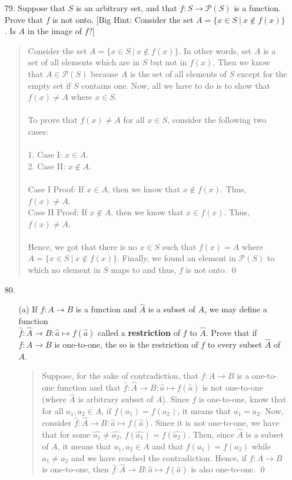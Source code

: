 \documentclass[12pt, a4paper]{article}
\begin{document}
\begin{itemize}
\item[79.]
Suppose that $S$ is an arbitrary set, and that $f : S \rightarrow \mathcal{P}(S)$ is a function. Prove
that $f$ is not onto. [Big Hint: Consider the set $A = \{x \in S \ | \ x \notin f(x)\}$. Is $A$ in the image of $f$?]
\begin{quote}
Consider the set $A = \{x \in S \ | \ x \notin f(x)\}$. In other words, set $A$ is a set of all elements
which are in $S$ but not in $f(x)$. Then we know that $A \in \mathcal{P}(S)$ because $A$
is the set of all elements of $S$ except for the empty set if $S$ contains one.
Now, all we have to do is to show that $f(x) \neq A$ where $x \in S$.\\\\
To prove that $f(x) \neq A$ for all $x \in S$, consider the following two cases:\\\\
1. Case I: $x \in A$.\\
2. Case II: $x \notin A$.
\\\\
Case I Proof: If $x \in A$, then we know that $x \notin f(x)$. Thus, $f(x) \neq A$.\\
Case II Proof: If $x \notin A$, then we know that $x \in f(x)$. Thus, $f(x) \neq A$.\\\\
Hence, we got that there is no $x \in S$ such that $f(x) = A$ where $A = \{x \in S \ | \ x \notin f(x)\}$.
Finally, we found an element in $\mathcal{P}(S)$ to which no element in $S$ maps to and thus,
$f$ is not onto.
\qed
\end{quote}

\item[]
\item[]

\item[80.]
\begin{itemize}
\item[(a)]
If $f : A \rightarrow B$ is a function and $\hat{A}$ is a subset of $A$, we may define a function\\
$\hat{f} : \hat{A} \rightarrow B : \hat{a} \mapsto f(\hat{a})$ called a \textbf{restriction} of $f$ to $\hat{A}$.
Prove that if $f : A \rightarrow B$ is one-to-one, the so is the restriction of $f$ to every subset $\hat{A}$ of $A$.
\begin{quote}
Suppose, for the sake of contradiction, that $f : A \rightarrow B$ is a one-to-one function and that $\hat{f} : \hat{A} \rightarrow B : \hat{a} \mapsto f(\hat{a})$
is not one-to-one (where $\hat{A}$ is arbitrary subset of $A$). Since $f$ is one-to-one, know that for all $a_1, a_2 \in A$, if $f(a_1) = f(a_2)$,
it means that $a_1 = a_2$. Now, consider $\hat{f} : \hat{A} \rightarrow B : \hat{a} \mapsto f(\hat{a})$.
Since it is not one-to-one, we have that for some $\hat{a_1} \neq \hat{a_2}$, $f(\hat{a_1}) = f(\hat{a_2})$.
Then, since $\hat{A}$ is a subset of $A$, it means that $a_1, a_2 \in A$ and that $f(a_1) = f(a_2)$ while $a_1 \neq a_2$
and we have reached the contradiction. Hence, if $f : A \rightarrow B$ is one-to-one, then $\hat{f} : \hat{A} \rightarrow B : \hat{a} \mapsto f(\hat{a})$ is also one-to-one.
\qed
\end{quote}


\end{itemize}
\end{itemize}
\end{document}
